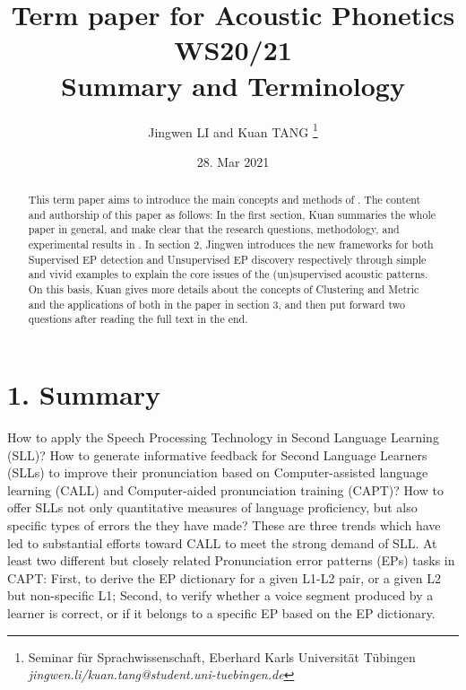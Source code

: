 \documentclass[nobib]{tufte-handout}
\title{{Term paper for Acoustic Phonetics WS20/21\\\cite{wang2015supervised} Summary and Terminology}}
\author{Jingwen LI and Kuan TANG
\thanks{
Seminar f\"ur Sprachwissenschaft, Eberhard Karls Universit\"at T\"ubingen \\
{\it{jingwen.li/kuan.tang@student.uni-tuebingen.de}}}}
\date{28. Mar 2021}
\begin{document}
\maketitle

\begin{abstract}
\noindent This term paper aims to introduce the main concepts and methods of \cite{wang2015supervised}. The content and authorship of this paper as follows: In the first section, Kuan summaries the whole paper in general, and make clear that the research questions, methodology, and experimental results in \cite{wang2015supervised}. In section 2, Jingwen introduces the new frameworks for both Supervised EP detection and  Unsupervised EP discovery respectively through simple and vivid examples to explain the core issues of the (un)supervised acoustic patterns. On this basis, Kuan gives more details about the concepts of Clustering and Metric and the applications of both in the paper in section 3, and then put forward two questions after reading the full text in the end.
\end{abstract}


\bigskip
\section{1. \textbf{Summary}}

How to apply the Speech Processing Technology in Second Language Learning (SLL)? How to generate informative feedback for Second Language Learners (SLLs) to improve their pronunciation based on Computer-assisted language learning (CALL)  and Computer-aided pronunciation training (CAPT)? How to offer SLLs not only quantitative measures of language proficiency, but also specific types of errors the they have made? These are three trends which have led to substantial efforts toward CALL to meet the strong demand of SLL. At least two different but closely related Pronunciation error patterns (EPs) tasks in CAPT: First, to derive the EP dictionary for a given L1-L2 pair, or a given L2 but non-specific L1; Second, to verify whether a voice segment produced by a learner is correct, or if it belongs to a specific EP based on the EP dictionary. 
\end{document}
